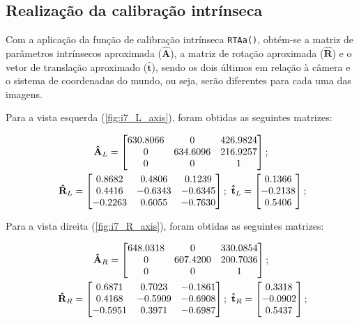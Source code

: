 \subsection{Realização da calibração intrínseca}

Com a aplicação da função de calibração intrínseca \texttt{RTAa()}, obtém-se a matriz de parâmetros intrínsecos aproximada ($\mathbf{\hat{A}}$), a matriz de rotação aproximada ($\mathbf{\hat{R}}$) e o vetor de translação aproximado ($\mathbf{\hat{t}}$), sendo os dois últimos em relação à câmera e o sistema de coordenadas do mundo, ou seja, serão diferentes para cada uma das imagens.

Para a vista esquerda (\autoref{fig:i7_L_axis}), foram obtidas as seguintes matrizes:

\begin{gather}\label{eq:ve}
\mathbf{\hat{A}}_L = \begin{bmatrix}
	630.8066 & 0        & 426.9824 \\
	0        & 634.6096 & 216.9257 \\
	0        & 0        & 1  
\end{bmatrix}; \\ \ \mathbf{\hat{R}}_L = \begin{bmatrix}
	0.8682  & 0.4806  & 0.1239  \\
	0.4416  & -0.6343 & -0.6345 \\
	-0.2263 & 0.6055  & -0.7630
\end{bmatrix}; \ \mathbf{\hat{t}}_L = \begin{bmatrix}
	0.1366 \\
	-0.2138 \\
	0.5406
\end{bmatrix};  \label{eq:rtL}
\end{gather}

Para a vista direita (\autoref{fig:i7_R_axis}), foram obtidas as seguintes matrizes:

\begin{gather}\label{eq:vd}
	\mathbf{\hat{A}}_R = \begin{bmatrix}
	648.0318 & 0        & 330.0854 \\
	0        & 607.4200 & 200.7036 \\
	0        & 0        & 1
	\end{bmatrix}; \\ \ \mathbf{\hat{R}}_R = \begin{bmatrix}
	0.6871  & 0.7023  & -0.1861 \\
	0.4168  & -0.5909 & -0.6908 \\
	-0.5951 & 0.3971  & -0.6987
	\end{bmatrix}; \ \mathbf{\hat{t}}_R = \begin{bmatrix}
	0.3318 \\
	-0.0902 \\
	0.5437
	\end{bmatrix}; \label{eq:rtR}
\end{gather}

